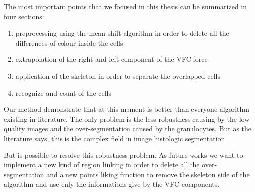 The most important points that we focused in this thesis can be summarized in four sections:
\begin{enumerate}
\item preprocessing using the mean shift algorithm in order to delete all the differences of colour inside the cells
\item extrapolation of the right and left component of the VFC force
\item application of the skeleton in order to separate the overlapped cells
\item recognize and count of the cells
\end{enumerate}

\bigskip

Our method demonstrate that at this moment is better than everyone algorithm existing in literature. The only problem is the less robustness causing by the low quality images and the over-segmentation caused by the granulocytes. But as the literature says, this is the complex field in image histologic segmentation.

But is possible to resolve this robustness problem. As future works we want to implement a new kind of region linking in order to delete all the over-segmentation and a new points liking function to remove the skeleton side of the algorithm and use only the informations give by the VFC components.